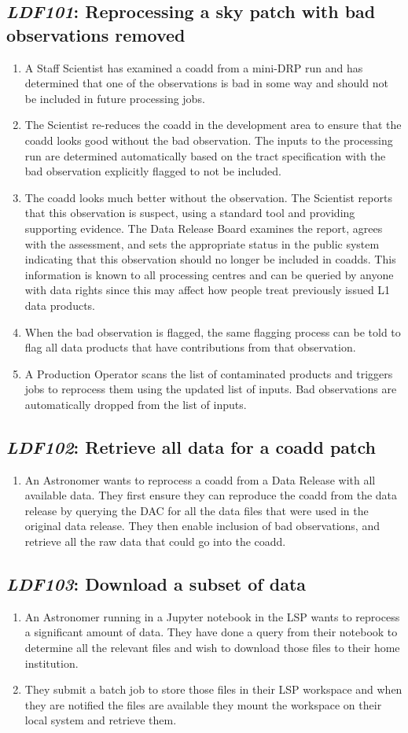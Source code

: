\documentclass[DM,toc,lsstdraft]{lsstdoc}
\newcommand{\usecase}[3]{%
\subsection{\emph{#1}: #2}
\label{use:#1}
\begin{enumerate}[label=\alph*.]
#3
\end{enumerate}
}
\begin{document}
\usecase{LDF101}{Reprocessing a sky patch with bad observations removed}{%

\item
A Staff Scientist has examined a coadd from a mini-DRP run and has determined that one of the observations is bad in some way and should not be included in future processing jobs.

\item
The Scientist re-reduces the coadd in the development area to ensure that the coadd looks good without the bad observation.
The inputs to the processing run are determined automatically based on the tract specification with the bad observation explicitly flagged to not be included.

\item
The coadd looks much better without the observation.
The Scientist reports that this observation is suspect, using a standard tool and providing supporting evidence.
The Data Release Board examines the report, agrees with the assessment, and sets the appropriate status in the public system indicating that this observation should no longer be included in coadds.
This information is known to all processing centres and can be queried by anyone with data rights since this may affect how people treat previously issued L1 data products.

\item
When the bad observation is flagged, the same flagging process can be told
to flag all data products that have contributions from that observation.

\item
A Production Operator scans the list of contaminated products and triggers jobs to reprocess them using the updated list of inputs.
Bad observations are automatically dropped from the list of inputs.

}

\usecase{LDF102}{Retrieve all data for a coadd patch}{%

\item
An Astronomer wants to reprocess a coadd from a Data Release with all available data.
They first ensure they can reproduce the coadd from the data release by querying the DAC for all the data files that were used in the original data release.
They then enable inclusion of bad observations, and retrieve all the raw data that could go into the coadd.

}

\usecase{LDF103}{Download a subset of data}{%

\item
An Astronomer running in a Jupyter notebook in the LSP wants to reprocess a significant amount of data.
They have done a query from their notebook to determine all the relevant files and wish to download those files to their home institution.

\item
They submit a batch job to store those files in their LSP workspace and when they are notified the files are available they mount the workspace on their local system and retrieve them.

}
\end{document}
